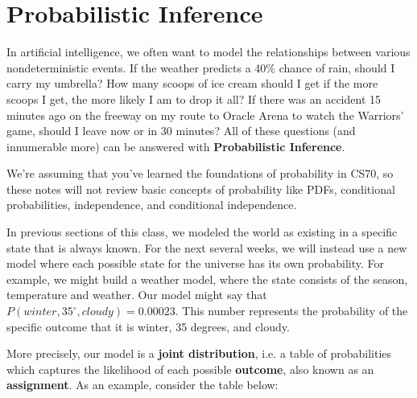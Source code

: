 \documentclass[11pt,fleqn]{article}
\def\title{Note \the\lecturenumber}
\begin{document}
\maketitle

\section*{Probabilistic Inference}

In artificial intelligence, we often want to model the relationships between various nondeterministic events. If the weather predicts a 40\% chance of rain, should I carry my umbrella? How many scoops of ice cream should I get if the more scoops I get, the more likely I am to drop it all? If there was an accident 15 minutes ago on the freeway on my route to Oracle Arena to watch the Warriors' game, should I leave now or in 30 minutes? All of these questions (and innumerable more) can be answered with \textbf{Probabilistic Inference}.

We're assuming that you've learned the foundations of probability in CS70, so these notes will not review basic concepts of probability like PDFs, conditional probabilities, independence, and conditional independence.

In previous sections of this class, we modeled the world as existing in a specific state that is always known. For the next several weeks, we will instead use a new model where each possible state for the universe has its own probability. For example, we might build a weather model, where the state consists of the season, temperature and weather. Our model might say that $P(winter, 35^\circ, cloudy) = 0.00023$. This number represents the probability of the specific outcome that it is winter, 35 degrees, and cloudy.

More precisely, our model is a \textbf{joint distribution}, i.e. a table of probabilities which captures the likelihood of each possible \textbf{outcome}, also known as an \textbf{assignment}. As an example, consider the table below:



\end{document}
\end{document}
